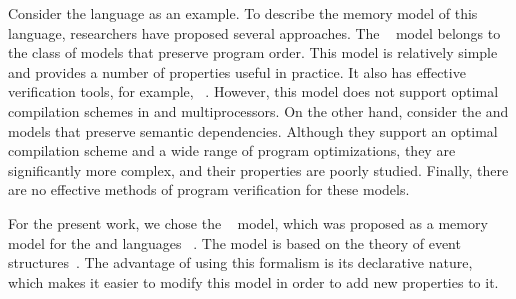 Consider the \CPP language as an example.
To describe the memory model of this language, researchers have proposed several approaches.
The \RCMM~\autocite{Lahav-al:PLDI17} model belongs to the class of models that preserve program order.
This model is relatively simple and provides a number of properties useful in practice.
It also has effective verification tools, for example, \genmc~\autocite{Kokologiannakis:PLDI2019}.
However, this model does not support optimal compilation schemes in \ARM and \POWER multiprocessors. On the other hand, consider the \Prm and \Wkm models that preserve semantic dependencies. Although they support an optimal compilation scheme and a wide range of program optimizations, they are significantly more complex, and their properties are poorly studied. Finally, there are no effective methods of program verification for these models.

For the present work, we chose the  \Wkm~\autocite{Chakraborty-Vafeiadis:POPL19} model, which was proposed as a memory model for the \CPP and \LLVM languages%
~\autocite{Chakraborty-Vafeiadis:CGO17}.
The \Wkm model is based on the theory of event structures~\autocite{Winskel:86,Winskel:ICALP1982}.
The advantage of using this formalism is its declarative nature, which makes it easier 
to modify this model in order to add new properties to it.

